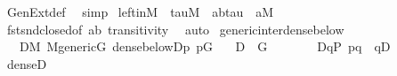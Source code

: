 \begin{isabellebody}
%
\isatagproof
{}\isamarkupfalse%
\ GenExt{\isacharunderscore}{\kern0pt}def\ \isamarkupfalse%
\ simp%
\endisatagproof
{\isafoldproof}%
%
\isadelimproof
\isanewline
%
\endisadelimproof
\isanewline
{}\isamarkupfalse%
\ left{\isacharunderscore}{\kern0pt}in{\isacharunderscore}{\kern0pt}M\ {\isacharcolon}{\kern0pt}\ {\isachardoublequoteopen}tau{\isasymin}M\ {\isasymLongrightarrow}\ {\isasymlangle}a{\isacharcomma}{\kern0pt}b{\isasymrangle}{\isasymin}tau\ {\isasymLongrightarrow}\ a{\isasymin}M{\isachardoublequoteclose}\isanewline
%
\isadelimproof
\ \ %
\endisadelimproof
%
\isatagproof
{}\isamarkupfalse%
\ fst{\isacharunderscore}{\kern0pt}snd{\isacharunderscore}{\kern0pt}closed{\isacharbrackleft}{\kern0pt}of\ {\isachardoublequoteopen}{\isasymlangle}a{\isacharcomma}{\kern0pt}b{\isasymrangle}{\isachardoublequoteclose}{\isacharbrackright}{\kern0pt}\ transitivity\ \isamarkupfalse%
\ auto%
\endisatagproof
{\isafoldproof}%
%
\isadelimproof
%
\endisadelimproof
%
\isadelimdocument
%
\endisadelimdocument
%
\isatagdocument
%
\isamarkuptrue%
%
\endisatagdocument
{\isafolddocument}%
%
\isadelimdocument
%
\endisadelimdocument
{}\isamarkupfalse%
\ generic{\isacharunderscore}{\kern0pt}inter{\isacharunderscore}{\kern0pt}dense{\isacharunderscore}{\kern0pt}below{\isacharcolon}{\kern0pt}\ \isanewline
\ \ \ {\isachardoublequoteopen}D{\isasymin}M{\isachardoublequoteclose}\ {\isachardoublequoteopen}M{\isacharunderscore}{\kern0pt}generic{\isacharparenleft}{\kern0pt}G{\isacharparenright}{\kern0pt}{\isachardoublequoteclose}\ {\isachardoublequoteopen}dense{\isacharunderscore}{\kern0pt}below{\isacharparenleft}{\kern0pt}D{\isacharcomma}{\kern0pt}p{\isacharparenright}{\kern0pt}{\isachardoublequoteclose}\ {\isachardoublequoteopen}p{\isasymin}G{\isachardoublequoteclose}\isanewline
\ \ \ {\isachardoublequoteopen}D\ {\isasyminter}\ G\ {\isasymnoteq}\ {}{\isachardoublequoteclose}\isanewline
%
\isadelimproof
%
\endisadelimproof
%
\isatagproof
{}\isamarkupfalse%
\ {\isacharminus}{\kern0pt}\isanewline
\ \ \isamarkupfalse%
\ {\isacharquery}{\kern0pt}D{\isacharequal}{\kern0pt}{\isachardoublequoteopen}{\isacharbraceleft}{\kern0pt}q{\isasymin}P{\isachardot}{\kern0pt}\ p{\isasymbottom}q\ {\isasymor}\ q{\isasymin}D{\isacharbraceright}{\kern0pt}{\isachardoublequoteclose}\isanewline
\ \ \isamarkupfalse%
\ {\isachardoublequoteopen}dense{\isacharparenleft}{\kern0pt}{\isacharquery}{\kern0pt}D{\isacharparenright}{\kern0pt}{\isachardoublequoteclose}\isanewline

\end{isabellebody}
